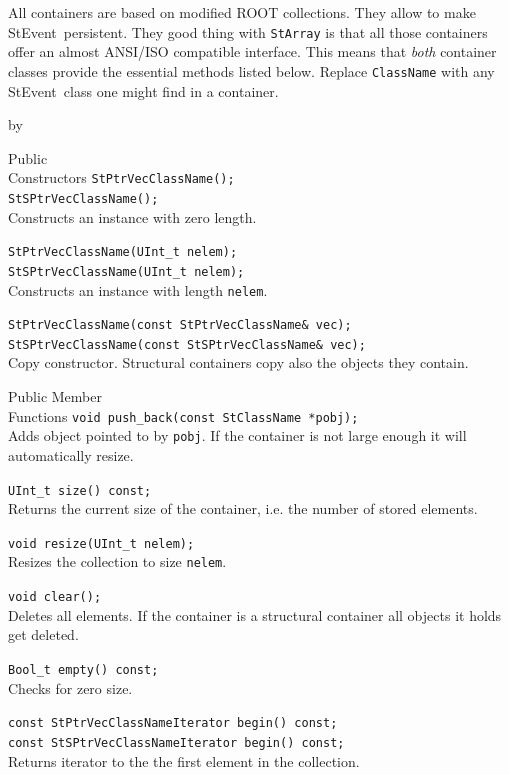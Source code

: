 \documentclass[twoside]{article}
\newcommand{\StEvent}{\textsf{StEvent}}
\newcommand{\entrylabel}[1]{\mbox{\textbf{{#1}}}\hfil}%
\newenvironment{entry}
{\begin{list}{}%
    {\renewcommand{\makelabel}{\entrylabel}%
     \setlength{\labelwidth}{90pt}%
     \setlength{\leftmargin}{\labelwidth}
     \advance\leftmargin by \labelsep%
      }%
    }%
  {\end{list}}
\newcommand{\Entrylabel}[1]%
{\raisebox{0pt}[1ex][0pt]{\makebox[\labelwidth][l]%
    {\parbox[t]{\labelwidth}{\hspace{0pt}\textbf{{#1}}}}}}
\newenvironment{Entry}%
{\renewcommand{\entrylabel}{\Entrylabel}\begin{entry}}%
  {\end{entry}}
\begin{document}
All containers are based on modified ROOT  collections.
They allow to make \StEvent\ persistent. They good thing with
\texttt{StArray} is that all those containers offer an almost ANSI/ISO
compatible interface.  This means that \emph{both} container classes
provide the essential methods listed below. Replace \texttt{ClassName}
with any \StEvent\ class one might find in a container.
\begin{Entry}
\item[Public\\ Constructors]
    \verb+StPtrVecClassName();+\\
    \verb+StSPtrVecClassName();+\\
    Constructs an instance with zero length.

    \verb+StPtrVecClassName(UInt_t nelem);+\\
    \verb+StSPtrVecClassName(UInt_t nelem);+\\
    Constructs an instance with length \texttt{nelem}.
    
    \verb+StPtrVecClassName(const StPtrVecClassName& vec);+\\
    \verb+StSPtrVecClassName(const StSPtrVecClassName& vec);+\\
    Copy constructor. Structural containers copy also the objects they
    contain.
    
\item[Public Member\\ Functions]
    \verb+void push_back(const StClassName *pobj);+\\
    Adds object pointed to by \texttt{pobj}. If the container is not
    large enough it will automatically resize.

    \verb+UInt_t size() const;+\\
    Returns the current size of the container, i.e. the number of
    stored elements.
    
    \verb+void resize(UInt_t nelem);+\\
    Resizes the collection to size \texttt{nelem}.

    \verb+void clear();+\\
    Deletes all elements. If the container is a structural container
    all objects it holds get deleted.
    
    \verb+Bool_t empty() const;+\\
    Checks for zero size.
    
    \verb+const StPtrVecClassNameIterator begin() const;+\\
    \verb+const StSPtrVecClassNameIterator begin() const;+\\
    Returns iterator to the the first element in the collection.
    

\end{Entry}
\end{document}

